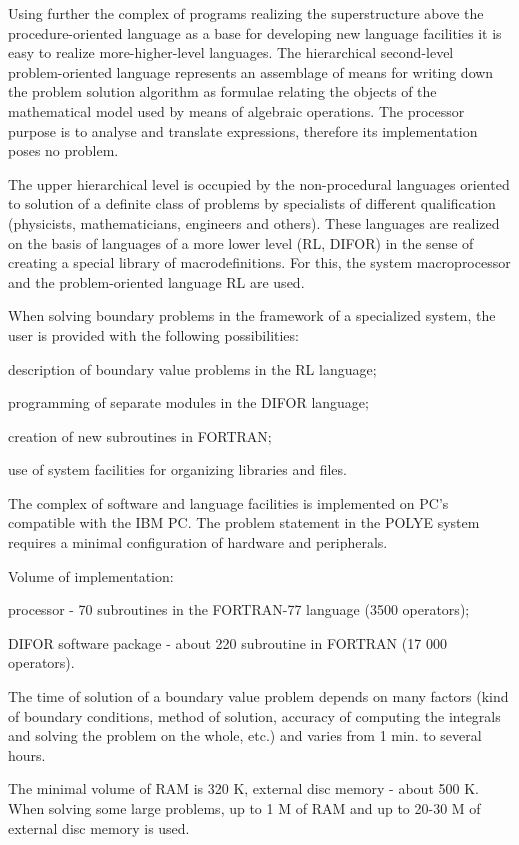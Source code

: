 Using further the complex of programs realizing the superstructure above the
procedure-oriented language as a base for developing new language facilities
it is easy to realize more-higher-level languages. The hierarchical
second-level problem-oriented language represents an assemblage of means for
writing down the problem solution algorithm as formulae relating the objects
of the mathematical model used by means of algebraic operations. The
processor purpose is to analyse and translate expressions, therefore its
implementation poses no problem.

The upper hierarchical level is occupied by the non-procedural languages
oriented to solution of a definite class of problems by specialists of
different qualification (physicists, mathematicians, engineers and others).
These languages are realized on the basis of languages of a more lower level
(RL, DIFOR) in the sense of creating a special library of macrodefinitions.
For this, the system macroprocessor and the problem-oriented language RL are
used.

When solving boundary problems in the framework of a specialized system, the
user is provided with the following possibilities:

description of boundary value problems in the RL language;

programming of separate modules in the DIFOR language;

creation of new subroutines in FORTRAN;

use of system facilities for organizing libraries and files.

The complex of software and language facilities is implemented on PC's
compatible with the IBM PC. The problem statement in the POLYE system
requires a minimal configuration of hardware and peripherals.

Volume of implementation:

processor - 70 subroutines in the FORTRAN-77 language (3500 operators);

DIFOR software package - about 220 subroutine in FORTRAN (17 000 operators).

The time of solution of a boundary value problem depends on many factors
(kind of boundary conditions, method of solution, accuracy of computing the
integrals and solving the problem on the whole, etc.) and varies from 1 min.
to several hours.

The minimal volume of RAM is 320 K, external disc memory - about 500 K. When
solving some large problems, up to 1 M of RAM and up to 20-30 M of external
disc memory is used.

